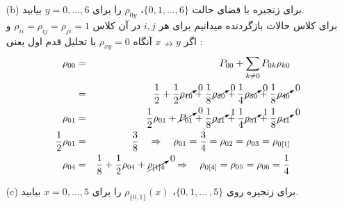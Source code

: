 \documentclass[11pt, a4, twoside]{article}
\begin{document}
\begin{problem}
\begin{itemize}
{\begin{figure}[h!]
\begin{subfigure}[b]{0.45\textwidth}
\begin{tikzpicture}[->, >=stealth', auto, semithick, node distance=2cm, scale=0.8, transform shape]
				\end{tikzpicture}
				\caption{گراف حالات $P_2$.}
			\end{subfigure}
		\end{figure}
		\[\begin{array}{ll|ll}
			P_1 & & P_2 & \\ \hline
			\{0\} & \textrm{گذرا}  & \{0,1\} & \textrm{بازگردنده} \\
			\{1,2,3\} & \textrm{بازگردنده} & \{2,4\} & \textrm{بازگردنده} \\
			\{4,5,6\} & \textrm{بازگردنده} & \{3,5\} & \textrm{گذرا}\\
		\end{array}\]
		از شکل گراف ها می‌توان تشخیص داد حالاتی که با ورود به آن ها خروج نخواهیم داشت قطعا بازگردنده هستند. در زنجیره اول حالت 0 به حالت 1 می‌رود و از آنجا به حالت 2 و 3 می‌رود و از آنجا به هیچ طریقی به حالت 0 بازنمی‌گردد. پس حالت 0 گذرا است. در زنجیره دوم، حالت 0 به حالت 1 می‌رود و از آنجا به حالت 0 برمی‌گردد. پس حالت 0 بازگردنده است.
		}
		\item[(b)] برای زنجیره با فضای حالت \(\{0, 1, \ldots, 6\}\)، $\rho_{0y}$ را برای $y = 0, \ldots, 6$ بیابید. \\
		{\color{blue}
		برای کلاس حالات بازگردنده میدانیم برای هر \(i,j\) در آن کلاس \(\rho_{ii} = \rho_{ij} = \rho_{ji} = 1 \) و اگر \(x \nrightarrow y\) آنگاه \(\rho_{xy} = 0\) 
		با تحلیل قدم اول یعنی :
		\begin{eqnarray*}
			\rho_{00} &=& P_{00} + \sum_{k \neq 0} P_{0k}\rho_{k0} \\
			&=& \frac{1}{2} + \frac{1}{2}\cancelto{0}{\rho_{10}} + \frac{1}{8}\cancelto{0}{\rho_{20}} + \frac{1}{4}\cancelto{0}{\rho_{30}} + \frac{1}{8}\cancelto{0}{\rho_{40}} \\
			\rho_{01} &=& \frac{1}{2}\rho_{01} + \cancelto{0}{P_{01}} + \frac{1}{8}\cancelto{1}{\rho_{21}} + \frac{1}{4}\cancelto{1}{\rho_{31}} + \frac{1}{8}\cancelto{0}{\rho_{41}} \\
			\frac{1}{2} \rho_{01} &=& \frac{3}{8} \quad \Rightarrow \quad \rho_{01} = \frac{3}{4} = \rho_{02} = \rho_{03} = \rho_{0[1]} \\
			\rho_{04} &=& \frac{1}{8} + \frac{1}{2} \rho_{04} + \cancelto{0}{\rho_{[1]4}} \quad \Rightarrow \quad \rho_{0[4]} = \rho_{05} = \rho_{06}= \frac{1}{4}
		\end{eqnarray*}
		}
		\item[(c)] برای زنجیره روی \(\{0,1 , \dots\ , 5 \}\)، $\rho_{\{0,1\}}(x)$ را برای $x = 0, \ldots, 5$ بیابید.
		\\

\end{itemize}
\end{problem}
\end{document}
